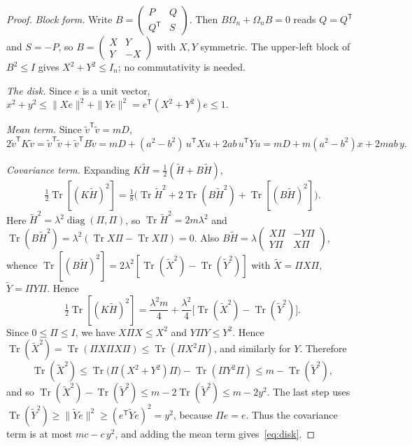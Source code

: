 \documentclass[11pt,a4paper]{article}
\theoremstyle{definition}\newtheorem{definition}{Definition}
\theoremstyle{remark}\newtheorem{remark}{Remark}
\newcommand{\tr}{\operatorname{Tr}}
\newcommand{\diag}{\operatorname{diag}}
\begin{document}
\begin{proof}
\emph{Block form.} Write $B=\left(\begin{smallmatrix}P&Q\\Q^{\mathsf T}&S\end{smallmatrix}\right)$. Then $B\Omega_n+\Omega_nB=0$ reads $Q=Q^{\mathsf T}$ and $S=-P$, so $B=\left(\begin{smallmatrix}X&Y\\Y&-X\end{smallmatrix}\right)$ with $X,Y$ symmetric. The upper-left block of $B^2\le I$ gives $X^2+Y^2\le I_n$; no commutativity is needed.

\emph{The disk.} Since $e$ is a unit vector, $x^2+y^2\le\|Xe\|^2+\|Ye\|^2=e^{\mathsf T}(X^2+Y^2)e\le1$.

\emph{Mean term.} Since $\tilde v^{\mathsf T}\tilde v=mD$,
\[
2\tilde v^{\mathsf T}K\tilde v=\tilde v^{\mathsf T}\tilde v+\tilde v^{\mathsf T}B\tilde v=mD+(a^2-b^2)\,u^{\mathsf T}Xu+2ab\,u^{\mathsf T}Yu=mD+m(a^2-b^2)x+2mab\,y .
\]

\emph{Covariance term.} Expanding $K\tilde H=\tfrac12(\tilde H+B\tilde H)$,
\[
\tfrac12\tr[(K\tilde H)^2]=\tfrac18\big(\tr\tilde H^2+2\tr(B\tilde H^2)+\tr[(B\tilde H)^2]\big).
\]
Here $\tilde H^2=\lambda^2\diag(\Pi,\Pi)$, so $\tr\tilde H^2=2m\lambda^2$ and $\tr(B\tilde H^2)=\lambda^2(\tr X\Pi-\tr X\Pi)=0$. Also $B\tilde H=\lambda\left(\begin{smallmatrix}X\Pi&-Y\Pi\\Y\Pi&X\Pi\end{smallmatrix}\right)$, whence $\tr[(B\tilde H)^2]=2\lambda^2[\tr(\tilde X^2)-\tr(\tilde Y^2)]$ with $\tilde X=\Pi X\Pi$, $\tilde Y=\Pi Y\Pi$. Hence
\[
\tfrac12\tr[(K\tilde H)^2]=\frac{\lambda^2m}{4}+\frac{\lambda^2}{4}\big[\tr(\tilde X^2)-\tr(\tilde Y^2)\big].
\]
Since $0\le\Pi\le I$, we have $X\Pi X\le X^2$ and $Y\Pi Y\le Y^2$. Hence $\tr(\tilde X^2)=\tr(\Pi X\Pi X\Pi)\le\tr(\Pi X^2\Pi)$, and similarly for $Y$. Therefore
\[
\tr(\tilde X^2)\le\tr\big(\Pi(X^2+Y^2)\Pi\big)-\tr(\Pi Y^2\Pi)\le m-\tr(\tilde Y^2),
\]
and so $\tr(\tilde X^2)-\tr(\tilde Y^2)\le m-2\tr(\tilde Y^2)\le m-2y^2$. The last step uses $\tr(\tilde Y^2)\ge\|\tilde Ye\|^2\ge(e^{\mathsf T}\tilde Ye)^2=y^2$, because $\Pi e=e$. Thus the covariance term is at most $mc-c\,y^2$, and adding the mean term gives~\eqref{eq:disk}.
\end{proof}
\end{document}
